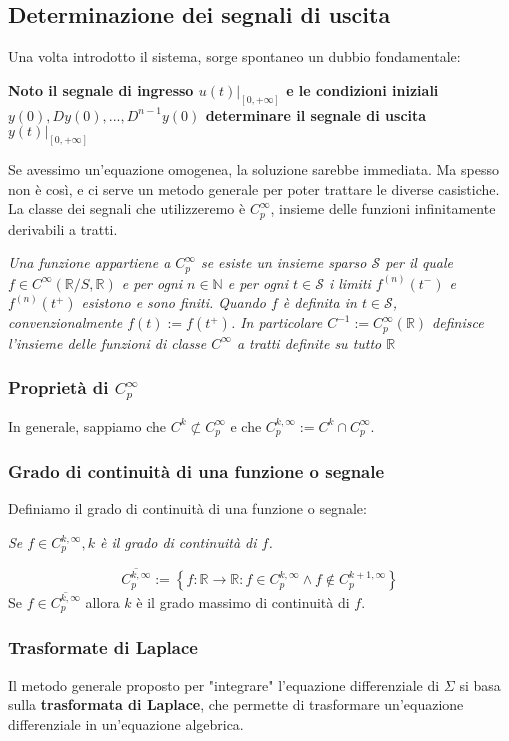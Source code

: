\documentclass[11pt]{article}
\begin{document}
\subsection{Determinazione dei segnali di uscita}
Una volta introdotto il sistema, sorge spontaneo un dubbio fondamentale:
\begin{center}
    \textbf{Noto il segnale di ingresso $u(t)|_{[0, +\infty]}$ e le condizioni iniziali $y(0), Dy(0),...,D^{n-1}y(0)$ determinare il segnale di uscita $y(t)|_{[0, +\infty]}$}
\end{center}
Se avessimo un'equazione omogenea, la soluzione sarebbe immediata. Ma spesso non è così, e ci serve un metodo generale per poter trattare le diverse casistiche.
La classe dei segnali che utilizzeremo è $C_p^\infty$, insieme delle funzioni infinitamente derivabili a tratti.
\begin{center}
    \textit{Una funzione appartiene a $C_p^\infty$ se esiste un insieme sparso $\mathcal{S}$ per il quale $f \in C^\infty (\mathbb{R}/S, \mathbb{R})$ e per ogni $n \in \mathbb{N}$ e per ogni $t \in \mathcal{S}$ i limiti $f^{(n)}(t^-)$ e $f^{(n)}(t^+)$ esistono e sono finiti. Quando $f$ è definita in $t \in \mathcal{S}$, convenzionalmente $f(t) := f(t^+)$. In particolare $C^{-1} := C_p^\infty (\mathbb{R})$ definisce l'insieme delle funzioni di classe $C^\infty$ a tratti definite su tutto $\mathbb{R}$}
\end{center}
\subsubsection{Proprietà di $C_p^\infty$}
In generale, sappiamo che $C^k \not\subset C^\infty_p$ e che $C_p^{k,\infty} := C^k \cap C^\infty_p$.
\subsubsection{Grado di continuità di una funzione o segnale}
Definiamo il grado di continuità di una funzione o segnale:
\begin{center}
    \textit{Se $f \in C_p^{k,\infty}, k $ è il grado di continuità di $f$.}
\end{center}
\begin{displaymath}
    \overline{C_p^{k,\infty}} := \left\{ f:\mathbb{R} \rightarrow \mathbb{R}:f \in C_p^{k, \infty}  \wedge f \not\in C_p^{k+1,\infty}\right\}
\end{displaymath}
Se $f \in \overline{C_p^{k,\infty}}$ allora $k$ è il grado massimo di continuità di $f$.
\subsubsection{Trasformate di Laplace}
Il metodo generale proposto per "integrare" l'equazione differenziale di $\Sigma$ si basa sulla \textbf{trasformata di Laplace}, che permette di trasformare un'equazione differenziale in un'equazione algebrica.
\end{document}
